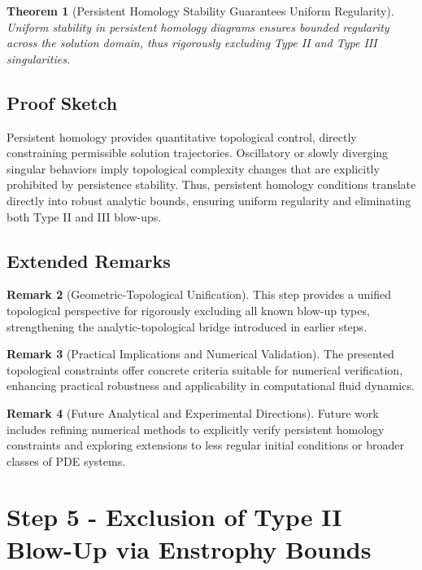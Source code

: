 \documentclass[11pt]{article}
\newtheorem{theorem}{Theorem}[section]
\theoremstyle{definition}
\newtheorem{remark}[theorem]{Remark}
\begin{document}
\begin{theorem}[Persistent Homology Stability Guarantees Uniform Regularity]
Uniform stability in persistent homology diagrams ensures bounded regularity across the solution domain, thus rigorously excluding Type II and Type III singularities.
\end{theorem}

\subsection*{Proof Sketch}
Persistent homology provides quantitative topological control, directly constraining permissible solution trajectories. Oscillatory or slowly diverging singular behaviors imply topological complexity changes that are explicitly prohibited by persistence stability. Thus, persistent homology conditions translate directly into robust analytic bounds, ensuring uniform regularity and eliminating both Type II and III blow-ups.

\subsection*{Extended Remarks}
\begin{remark}[Geometric-Topological Unification]
This step provides a unified topological perspective for rigorously excluding all known blow-up types, strengthening the analytic-topological bridge introduced in earlier steps.
\end{remark}

\begin{remark}[Practical Implications and Numerical Validation]
The presented topological constraints offer concrete criteria suitable for numerical verification, enhancing practical robustness and applicability in computational fluid dynamics.
\end{remark}

\begin{remark}[Future Analytical and Experimental Directions]
Future work includes refining numerical methods to explicitly verify persistent homology constraints and exploring extensions to less regular initial conditions or broader classes of PDE systems.
\end{remark}


\section{Step 5 - Exclusion of Type II Blow-Up via Enstrophy Bounds}
\label{sec:step5}
\end{document}
